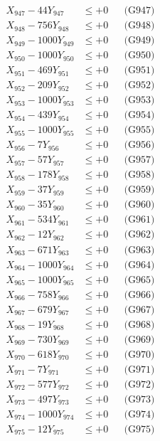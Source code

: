 \documentclass[a4paper,10pt]{article}
\begin{document}
{\begin{align}
X_{947} - 44Y_{947} &\leq +0 && \text{(G947)} \\
X_{948} - 756Y_{948} &\leq +0 && \text{(G948)} \\
X_{949} - 1000Y_{949} &\leq +0 && \text{(G949)} \\
X_{950} - 1000Y_{950} &\leq +0 && \text{(G950)} \\
\allowbreak
X_{951} - 469Y_{951} &\leq +0 && \text{(G951)} \\
X_{952} - 209Y_{952} &\leq +0 && \text{(G952)} \\
X_{953} - 1000Y_{953} &\leq +0 && \text{(G953)} \\
X_{954} - 439Y_{954} &\leq +0 && \text{(G954)} \\
X_{955} - 1000Y_{955} &\leq +0 && \text{(G955)} \\
X_{956} - 7Y_{956} &\leq +0 && \text{(G956)} \\
X_{957} - 57Y_{957} &\leq +0 && \text{(G957)} \\
X_{958} - 178Y_{958} &\leq +0 && \text{(G958)} \\
X_{959} - 37Y_{959} &\leq +0 && \text{(G959)} \\
X_{960} - 35Y_{960} &\leq +0 && \text{(G960)} \\
\allowbreak
X_{961} - 534Y_{961} &\leq +0 && \text{(G961)} \\
X_{962} - 12Y_{962} &\leq +0 && \text{(G962)} \\
X_{963} - 671Y_{963} &\leq +0 && \text{(G963)} \\
X_{964} - 1000Y_{964} &\leq +0 && \text{(G964)} \\
X_{965} - 1000Y_{965} &\leq +0 && \text{(G965)} \\
X_{966} - 758Y_{966} &\leq +0 && \text{(G966)} \\
X_{967} - 679Y_{967} &\leq +0 && \text{(G967)} \\
X_{968} - 19Y_{968} &\leq +0 && \text{(G968)} \\
X_{969} - 730Y_{969} &\leq +0 && \text{(G969)} \\
X_{970} - 618Y_{970} &\leq +0 && \text{(G970)} \\
\allowbreak
X_{971} - 7Y_{971} &\leq +0 && \text{(G971)} \\
X_{972} - 577Y_{972} &\leq +0 && \text{(G972)} \\
X_{973} - 497Y_{973} &\leq +0 && \text{(G973)} \\
X_{974} - 1000Y_{974} &\leq +0 && \text{(G974)} \\
X_{975} - 12Y_{975} &\leq +0 && \text{(G975)} \\

\end{align}}
\end{document}
